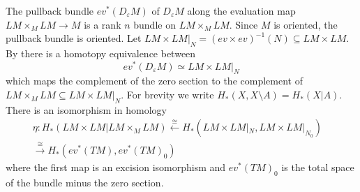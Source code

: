 \documentclass{scrartcl}
\theoremstyle{plain}
\newtheorem{lemma}[theorem]{Lemma}
\theoremstyle{definition}
\renewcommand{\epsilon}{\varepsilon}
\renewcommand{\subset}{\subseteq}
\newcommand{\iso}{\cong}
\newcommand{\quiso}{\simeq}
\let\xto\xrightarrow
\let\xfrom\xleftarrow
\newcommand{\injto}{\hookrightarrow}
\renewcommand{\coprod}{\mathbin{\amalg}}
\begin{document}
The pullback bundle $ev^*(D_\epsilon M)$ of $D_\epsilon M$ along the evaluation map $LM\times_M LM\to M$ is a rank $n$ bundle on $LM\times_M LM$. Since $M$ is oriented, the pullback bundle is oriented. Let $LM\times LM|_N = (ev\times ev)^{-1}(N)\subset LM\times LM$. By \cite[p. 8]{cohen2002homotopy} there is a homotopy equivalence between 
$$ev^*(D_\epsilon M) \quiso LM\times LM|_N$$
which maps the complement of the zero section to the complement of $LM\times_M LM\subset LM\times LM|_N$. For brevity we write $H_*(X, X\setminus A) = H_*(X | A)$. There is an isomorphism in homology 
\begin{align*}
\eta\colon H_*(LM\times LM | LM\times_M LM) \xfrom{\iso} H_*(LM\times LM |_N, LM\times LM|_{N_0}) &\\ \xto{\iso} H_*(ev^*(TM), ev^*(TM)_0)&
\end{align*}
where the first map is an excision isomorphism and $ev^*(TM)_0$ is the total space of the bundle minus the zero section.


    
    
\end{document}
